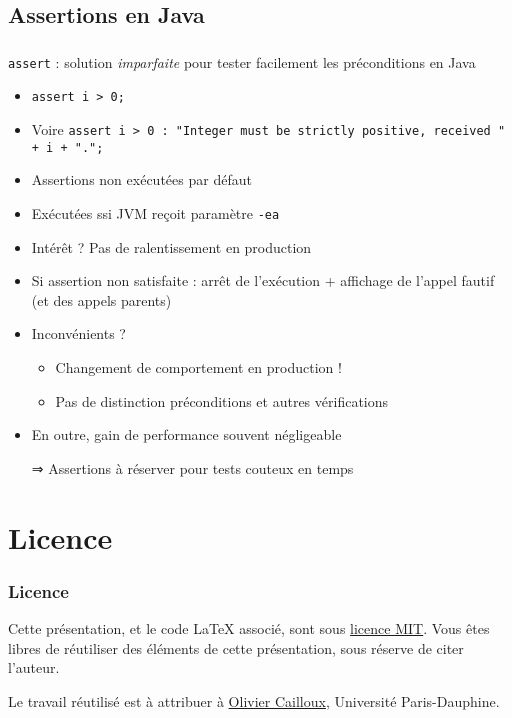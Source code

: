 \documentclass[english, french]{beamer}
\begin{document}
\subsection{Assertions en Java}
\begin{frame}
	\frametitle{\subsecname}
	\texttt{assert} : solution \emph{imparfaite} pour tester facilement les préconditions en Java
	\begin{itemize}
		\item \texttt{assert i > 0;}
		\item Voire \texttt{assert i > 0 : "Integer must be strictly positive, received " + i + ".";}
		\item Assertions non exécutées par défaut
		\item Exécutées ssi JVM reçoit paramètre \texttt{-ea}
		\item Intérêt ? \pause Pas de ralentissement en production \pause
		\item Si assertion non satisfaite : arrêt de l’exécution + affichage de l’appel fautif (et des appels parents)
		\item Inconvénients ? \pause
		\begin{itemize}
			\item Changement de comportement en production !
			\item Pas de distinction préconditions et autres vérifications
		\end{itemize}
		\item En outre, gain de performance souvent négligeable
		\item[⇒] Assertions à réserver pour tests couteux en temps
	\end{itemize}
\end{frame}

\appendix
\section{Licence}
\begin{frame}
	\frametitle{Licence}
	Cette présentation, et le code LaTeX associé, sont sous \href{http://opensource.org/licenses/MIT}{licence MIT}. Vous êtes libres de réutiliser des éléments de cette présentation, sous réserve de citer l’auteur.
	
	Le travail réutilisé est à attribuer à \href{http://www.lamsade.dauphine.fr/~ocailloux/}{Olivier Cailloux}, Université Paris-Dauphine.
\end{frame}
\end{document}

